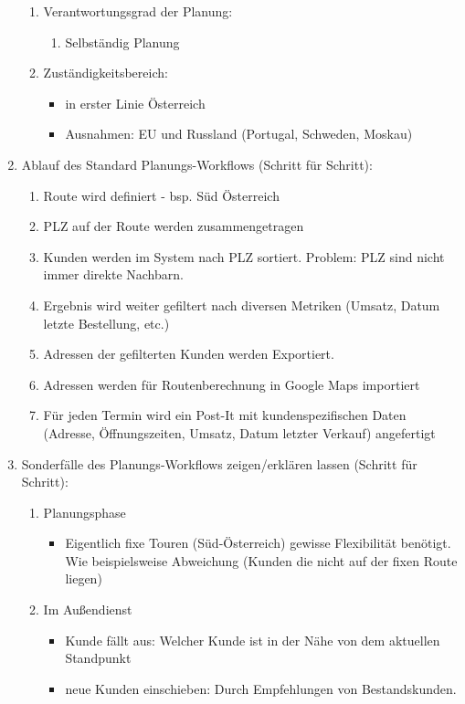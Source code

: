 \documentclass[Bachelorarbeit.tex]{subfiles}
\begin{document}
\begin{enumerate}
\begin{enumerate}
		\item Verantwortungsgrad der Planung:
		\begin{enumerate}
			\item[] Selbständig Planung
		\end{enumerate}
		\item Zuständigkeitsbereich:
		\begin{itemize}
			\item in erster Linie Österreich 
			\item Ausnahmen: EU und Russland  (Portugal, Schweden,  Moskau)
		\end{itemize}
	\end{enumerate}
	\item Ablauf des Standard Planungs-Workflows (Schritt für Schritt):
	\begin{enumerate}
		\item Route wird definiert - bsp. Süd Österreich
		\item PLZ auf der Route werden zusammengetragen
		\item Kunden werden im System nach PLZ sortiert. Problem: PLZ sind nicht immer direkte Nachbarn.
		\item Ergebnis wird weiter gefiltert nach diversen Metriken (Umsatz, Datum letzte Bestellung, etc.)
		\item Adressen der gefilterten Kunden werden Exportiert.
		\item Adressen werden für Routenberechnung in Google Maps importiert
		\item Für jeden Termin wird ein Post-It mit kundenspezifischen Daten (Adresse, Öffnungszeiten, Umsatz, Datum letzter Verkauf) angefertigt
	\end{enumerate}
	\item Sonderfälle des Planungs-Workflows zeigen/erklären lassen (Schritt für Schritt):
	\begin{enumerate}
		\item Planungsphase
		\begin{itemize}
			\item Eigentlich fixe Touren (Süd-Österreich) gewisse Flexibilität benötigt. Wie beispielsweise Abweichung (Kunden die nicht auf der fixen Route liegen) 
		\end{itemize}
		\item Im Außendienst
		\begin{itemize}
			\item Kunde fällt aus: Welcher Kunde ist in der Nähe von dem aktuellen Standpunkt
			\item neue Kunden einschieben: Durch Empfehlungen von Bestandskunden. 

\end{itemize}
\end{enumerate}
\end{enumerate}
\end{document}
